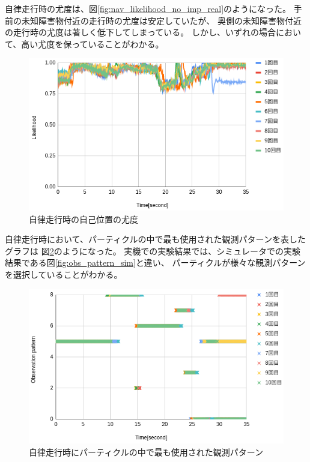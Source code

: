 自律走行時の尤度は、図\ref{fig:nav_likelihood_no_imp_real}のようになった。
手前の未知障害物付近の走行時の尤度は安定していたが、
奥側の未知障害物付近の走行時の尤度は著しく低下してしまっている。
しかし、いずれの場合において、高い尤度を保っていることがわかる。

\begin{figure}[H]
  \begin{center}
    \includegraphics[width=0.98\linewidth]{figs/real_likelihood_after.png}
    \caption{自律走行時の自己位置の尤度}
    \label{fig:sim_world}
  \end{center}
\end{figure}

自律走行時において、パーティクルの中で最も使用された観測パターンを表したグラフは
図\ref{fig:obs_pattern_sim_real}のようになった。
実機での実験結果では、シミュレータでの実験結果である図\ref{fig:obs_pattern_sim}と違い、
パーティクルが様々な観測パターンを選択していることがわかる。

\begin{figure}[H]
  \begin{center}
    \includegraphics[width=0.98\linewidth]{figs/real_imp_ob_pattern.png}
    \caption{自律走行時にパーティクルの中で最も使用された観測パターン}
    \label{fig:obs_pattern_sim_real}
  \end{center}
\end{figure}
